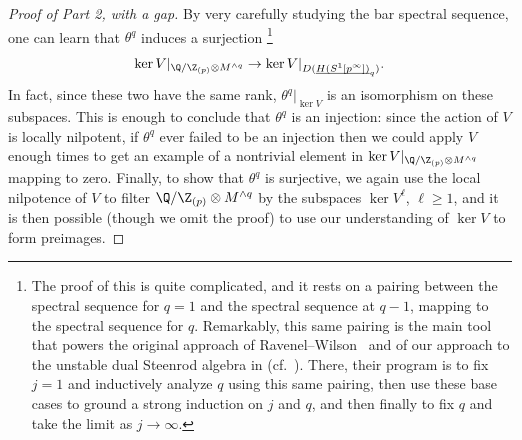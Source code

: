 \begin{proof}[Proof of Part 2, with a gap]
By very carefully studying the bar spectral sequence, one can learn that \(\theta^q\) induces a surjection%
\footnote{%
The proof of this is quite complicated, and it rests on a pairing between the spectral sequence for \(q = 1\) and the spectral sequence at \(q - 1\), mapping to the spectral sequence for \(q\).
Remarkably, this same pairing is the main tool that powers the original approach of
Ravenel--Wilson~\cite{RavenelWilsonKthyOfEMSpaces} and of our approach to the unstable dual Steenrod algebra in  (cf.\ ).
There, their program is to fix \(j = 1\) and inductively analyze \(q\) using this same pairing, then use these base cases to ground a strong induction on \(j\) and \(q\), and then finally to fix \(q\) and take the limit as \(j \to \infty\).
}
\[\ker V|_{\Q / \Z_{(p)} \otimes M^{\wedge q}} \to \ker V|_{D(\OS{H(S^1[p^\infty])}{q})}.\]
In fact, since these two have the same rank, \(\theta^q|_{\ker V}\) is an isomorphism on these subspaces.
This is enough to conclude that \(\theta^q\) is an injection: since the action of \(V\) is locally nilpotent, if \(\theta^q\) ever failed to be an injection then we could apply \(V\) enough times to get an example of a nontrivial element in \(\ker V|_{\Q / \Z_{(p)} \otimes M^{\wedge q}}\) mapping to zero.
Finally, to show that \(\theta^q\) is surjective, we again use the local nilpotence of \(V\) to filter \(\Q / \Z_{(p)} \otimes M^{\sm q}\) by the subspaces \(\ker V^\ell\), \(\ell \ge 1\), and it is then possible (though we omit the proof) to use our understanding of \(\ker V\) to form preimages.
\end{proof}

